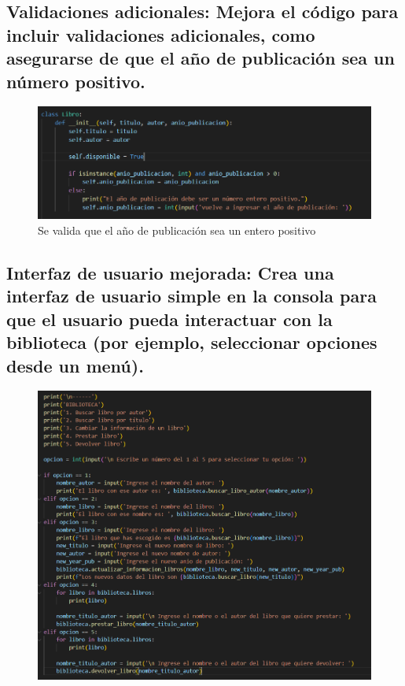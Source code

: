 \documentclass[11pt,a4paper]{article}
\begin{document}
\subsection{Validaciones adicionales:
Mejora el código para incluir validaciones adicionales, como asegurarse de que el año de publicación sea un número positivo.}

\begin{figure}[H]
    \centering
    \includegraphics[width=1\linewidth]{images/6-validacion.png}
    \caption{Se valida que el año de publicación sea un entero positivo}
    \label{fig:enter-label}
\end{figure}

\subsection{Interfaz de usuario mejorada:
Crea una interfaz de usuario simple en la consola para que el usuario pueda interactuar con la biblioteca (por ejemplo, seleccionar opciones desde un menú).}

\begin{figure}[H]
    \centering
    \includegraphics[width=1\linewidth]{images/7-codigo.png}
    \caption{}
    \label{fig:enter-label}
\end{figure}
\end{document}
